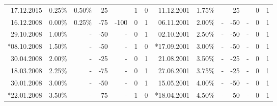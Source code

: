 \documentclass[11pt,a4paper,english,oneside]{book}
\numberwithin{equation}{chapter}
\begin{document}
\begin{table}
\begin{tabular}{r r r r r c c | r r r r r c c }
		17.12.2015 & 0.25\% & 0.50\% & 25  &  -   & 1 & 0 & \cellcolor{lightgray!25}11.12.2001 & \cellcolor{lightgray!25}1.75\% &  \cellcolor{lightgray!25}- & \cellcolor{lightgray!25}-25 &  \cellcolor{lightgray!25}- & 0 & 1 \\
		\cellcolor{lightgray!25}16.12.2008 & \cellcolor{lightgray!25}0.00\% & \cellcolor{lightgray!25}0.25\% & \cellcolor{lightgray!25}-75 & \cellcolor{lightgray!25}-100 & 0 & 1 & \cellcolor{lightgray!25}06.11.2001 & \cellcolor{lightgray!25}2.00\% &  \cellcolor{lightgray!25}- & \cellcolor{lightgray!25}-50 &  \cellcolor{lightgray!25}- & 0 & 1 \\
		\cellcolor{lightgray!25}29.10.2008 & \cellcolor{lightgray!25}1.00\% &   \cellcolor{lightgray!25}-    & \cellcolor{lightgray!25}-50 &  \cellcolor{lightgray!25}-   & 0 & 1 & \cellcolor{lightgray!25}02.10.2001 & \cellcolor{lightgray!25}2.50\% &  \cellcolor{lightgray!25}- & \cellcolor{lightgray!25}-50 &  \cellcolor{lightgray!25}- & 0 & 1 \\
		\cellcolor{lightgray!25}*08.10.2008 & \cellcolor{lightgray!25}1.50\% &  \cellcolor{lightgray!25} -    & \cellcolor{lightgray!25}-50 &  \cellcolor{lightgray!25}-   & 1 & 0 & \cellcolor{lightgray!25}*17.09.2001 & \cellcolor{lightgray!25}3.00\% &  \cellcolor{lightgray!25}- & \cellcolor{lightgray!25}-50 &  \cellcolor{lightgray!25}- & 0 & 1 \\
		\cellcolor{lightgray!25}30.04.2008 & \cellcolor{lightgray!25}2.00\% &  \cellcolor{lightgray!25} -    & \cellcolor{lightgray!25}-25 &  \cellcolor{lightgray!25}-   & 0 & 1 & \cellcolor{lightgray!25}21.08.2001 & \cellcolor{lightgray!25}3.50\% &  \cellcolor{lightgray!25}- & \cellcolor{lightgray!25}-25 &  \cellcolor{lightgray!25}- & 0 & 1 \\
		\cellcolor{lightgray!25}18.03.2008 & \cellcolor{lightgray!25}2.25\% &  \cellcolor{lightgray!25} -    & \cellcolor{lightgray!25}-75 &  \cellcolor{lightgray!25}-   & 0 & 1 & \cellcolor{lightgray!25}27.06.2001 & \cellcolor{lightgray!25}3.75\% &  \cellcolor{lightgray!25}- & \cellcolor{lightgray!25}-25 &  \cellcolor{lightgray!25}- & 0 & 1 \\
		\cellcolor{lightgray!25}30.01.2008 & \cellcolor{lightgray!25}3.00\% &  \cellcolor{lightgray!25} -    & \cellcolor{lightgray!25}-50 &  \cellcolor{lightgray!25}-   & 0 & 1 & \cellcolor{lightgray!25}15.05.2001 & \cellcolor{lightgray!25}4.00\% &  \cellcolor{lightgray!25}- & \cellcolor{lightgray!25}-50 &  \cellcolor{lightgray!25}- & 0 & 1 \\
		\cellcolor{lightgray!25}*22.01.2008 & \cellcolor{lightgray!25}3.50\% &  \cellcolor{lightgray!25} -    & \cellcolor{lightgray!25}-75 &  \cellcolor{lightgray!25}-   & 1 & 0 & \cellcolor{lightgray!25}*18.04.2001 & \cellcolor{lightgray!25}4.50\% &  \cellcolor{lightgray!25}- & \cellcolor{lightgray!25}-50 &  \cellcolor{lightgray!25}- & 0 & 1 \\

\end{tabular}
\end{table}
\end{document}
